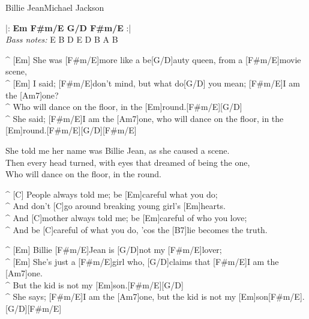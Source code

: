 \begin{song}{Billie Jean}{Michael Jackson}

\begin{guitar}
|:\textbf{ Em  F#m/E G/D  F#m/E } :|\\
\emph{Bass notes:} E B D E D B A B\\
\end{guitar}

\begin{guitar}
^ [Em] She was [F#m/E]more like a be[G/D]auty queen, from a [F#m/E]movie scene,\\
^ [Em] I said; [F#m/E]don't mind, but what do[G/D] you mean; [F#m/E]I am the [Am7]one?\\
^ Who will dance on the floor, in the [Em]round.[F#m/E][G/D]\\
^ She said; [F#m/E]I am the [Am7]one, who will dance on the floor, in the [Em]round.[F#m/E][G/D][F#m/E]\\
\end{guitar}

\begin{guitar}
She told me her name was Billie Jean, as she caused a scene.\\
Then every head turned, with eyes that dreamed of being the one,\\
Who will dance on the floor, in the round.\\
\end{guitar}


\begin{guitar}
^ [C] People always told me; be [Em]careful what you do;\\
^ And don't [C]go around breaking young girl's [Em]hearts.\\
^ And [C]mother always told me; be [Em]careful of who you love;\\
^ And be [C]careful of what you do, 'cos the [B7]lie becomes the truth.\\
\end{guitar}

\begin{guitar}
^ [Em] Billie [F#m/E]Jean is [G/D]not my [F#m/E]lover;\\
^ [Em] She's just a [F#m/E]girl who, [G/D]claims that [F#m/E]I am the [Am7]one.\\
^ But the kid is not my [Em]son.[F#m/E][G/D]\\
^ She says; [F#m/E]I am the [Am7]one, but the kid is not my [Em]son[F#m/E].[G/D][F#m/E]\\
\end{guitar}


\end{song}
